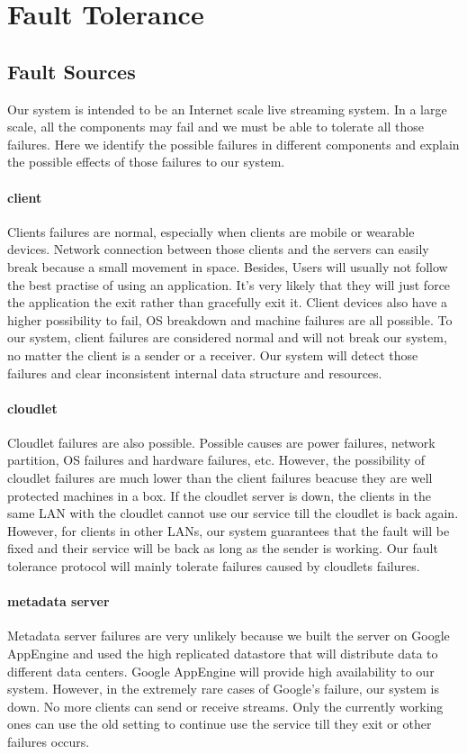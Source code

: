 \documentclass[letterpaper,twocolumn,10pt]{article}
\begin{document}
\section{Fault Tolerance}

\subsection{Fault Sources}
Our system is intended to be an Internet scale live streaming system. In a large scale, all the components may fail and we must be able to tolerate all those failures. Here we identify the possible failures in different components and explain the possible effects of those failures to our system.

\paragraph{client}
Clients failures are normal, especially when clients are mobile or wearable devices. Network connection between those clients and the servers can easily break because a small movement in space. Besides, Users will usually not follow the best practise of using an application. It's very likely that they will just force the application the exit rather than gracefully exit it. Client devices also have a higher possibility to fail, OS breakdown and machine failures are all possible. To our system, client failures are considered normal and will not break our system, no matter the client is a sender or a receiver. Our system will detect those failures and clear inconsistent internal data structure and resources.

\paragraph{cloudlet}
Cloudlet failures are also possible. Possible causes are power failures, network partition, OS failures and hardware failures, etc. However, the possibility of cloudlet failures are much lower than the client failures beacuse they are well protected machines in a box. If the cloudlet server is down, the clients in the same LAN with the cloudlet cannot use our service till the cloudlet is back again. However, for clients in other LANs, our system guarantees that the fault will be fixed and their service will be back as long as the sender is working. Our fault tolerance protocol will mainly tolerate failures caused by cloudlets failures.

\paragraph{metadata server}
Metadata server failures are very unlikely because we built the server on Google AppEngine and used the high replicated datastore that will distribute data to different data centers. Google AppEngine will provide high availability to our system. However, in the extremely rare cases of Google's failure, our system is down. No more clients can send or receive streams. Only the currently working ones can use the old setting to continue use the service till they exit or other failures occurs.
\end{document}
